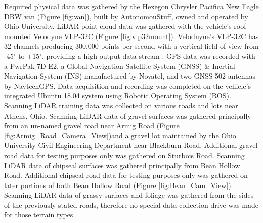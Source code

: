 \documentclass[journal,onecolumn]{IEEEtran}
\begin{document}
	{Required physical data was gathered by the Hexegon Chrysler Pacifica New Eagle DBW van (Figure \ref{fig:van}), built by AutonomouStuff, owned and operated by Ohio University. LiDAR point cloud data was gathered with the vehicle's roof-mounted Velodyne VLP-32C (Figure \ref{fig:vlp32mount}). Velodnyne's VLP-32C has 32 channels producing 300,000 points per second with a vertical field of view from -45$^{\circ}$ to $+$15$^{\circ}$, providing a high output data stream \cite{vlp_32c}. GPS data was recorded with a PwrPak 7D-E2, a Global Navigation Satellite System (GNSS) \& Inertial Navigation System (INS) manufactured by Novatel, and two GNSS-502 antennas by NavtechGPS. Data acquisition and recording was completed on the vehicle's integrated Ubuntu 18.04 system using Robotic Operating System (ROS). Scanning LiDAR training data was collected on various roads and lots near Athens, Ohio. Scanning LiDAR data of gravel surfaces was gathered principally from an un-named gravel road near Armig Road (Figure \ref{fig:Armig_Road_Camera_View})and a gravel lot maintained by the Ohio University Civil Engineering Department near Blackburn Road. Additional gravel road data for testing purposes only was gathered on Sturbois Road. Scanning LiDAR data of chipseal surfaces was gathered principally from Bean Hollow Road. Additional chipseal road data for testing purposes only was gathered on later portions of both Bean Hollow Road (Figure \ref{fig:Bean_Cam_View}). Scanning LiDAR data of grassy surfaces and foliage was gathered from the sides of the previously stated roads, therefore no special data collection drive was made for those terrain types.}
	
\end{document}
